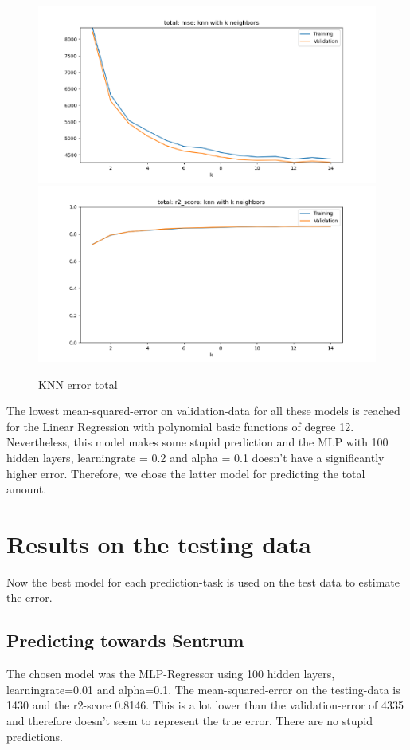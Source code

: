 \documentclass[12pt,a4paper]{scrartcl}		%
\begin{document}
\begin{figure}[h]
    \centering
    \includegraphics[scale = 0.8]{total_knn_mse.png}
    \includegraphics[scale = 0.8]{total_knn_r2.png}
    \caption{KNN error total}
    \label{fig::knntotal}
\end{figure}

The lowest mean-squared-error on validation-data for all these models is reached for the Linear Regression with polynomial basic functions of degree 12. Nevertheless, 
this model makes some stupid prediction and the MLP with 100 hidden layers, learningrate = 0.2 and alpha = 0.1 doesn’t have a significantly higher error. 
Therefore, we chose the latter model for predicting the total amount.

\section{Results on the testing data}
Now the best model for each prediction-task is used on the test data to estimate the error. 

\subsection{Predicting towards Sentrum}
The chosen model was the MLP-Regressor using 100 hidden layers, learningrate=0.01 and alpha=0.1. The mean-squared-error on the testing-data is 1430 and the r2-score 0.8146. 
This is a lot lower than the validation-error of 4335 and therefore doesn’t seem to represent the true error. There are no stupid predictions.
\end{document}
